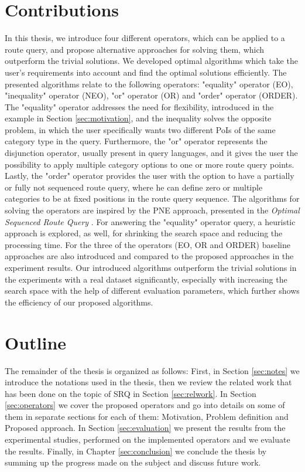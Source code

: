 \section{Contributions}
In this thesis, we introduce four different operators, which can be applied to a route query, and propose alternative approaches for solving them, which outperform the trivial solutions. We developed optimal algorithms which take the user's requirements into account and find the optimal solutions efficiently. The presented algorithms relate to the following operators: "equality" operator (EO), "inequality" operator (NEO), "or" operator (OR) and "order" operator (ORDER). The "equality" operator addresses the need for flexibility, introduced in the example in Section \ref{sec:motivation}, and the inequality solves the opposite problem, in which the user specifically wants two different PoIs of the same category type in the query. Furthermore, the "or" operator represents the disjunction operator, usually present in query languages, and it gives the user the possibility to apply multiple category options to one or more route query points. Lastly, the "order" operator provides the user with the option to have a partially or fully not sequenced route query, where he can define zero or multiple categories to be at fixed positions in the route query sequence. \newline
The algorithms for solving the operators are inspired by the PNE approach, presented in the \textit{Optimal Sequenced Route Query} \cite{OSR}. For answering the "equality" operator query, a heuristic approach is explored, as well, for shrinking the search space and reducing the processing time. For the three of the operators (EO, OR and ORDER) baseline approaches are also introduced and compared to the proposed approaches in the experiment results. Our introduced algorithms outperform the trivial solutions in the experiments with a real dataset significantly, especially with increasing the search space with the help of different evaluation parameters, which further shows the efficiency of our proposed algorithms.

\section{Outline}
The remainder of the thesis is organized as follows: First, in Section \ref{sec:notes} we introduce the notations used in the thesis, then we review the related work that has been done on the topic of SRQ in Section \ref{sec:relwork}. In Section \ref{sec:operators} we cover the proposed operators and go into details on some of them in separate sections for each of them: Motivation, Problem definition and Proposed approach. In Section \ref{sec:evaluation} we present the results from the experimental studies, performed on the implemented operators and we evaluate the results. Finally, in Chapter \ref{sec:conclusion} we conclude the thesis by summing up the progress made on the subject and discuss future work.